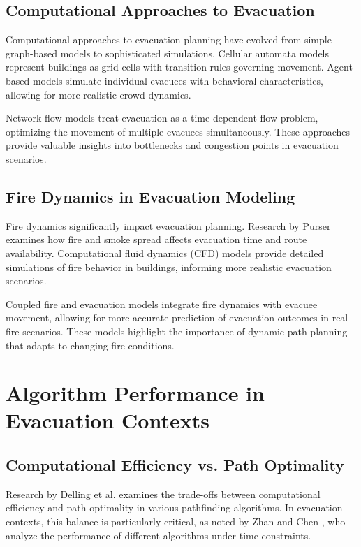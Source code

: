 \documentclass[11pt,a4paper]{report}
\begin{document}
\subsection{Computational Approaches to Evacuation}
Computational approaches to evacuation planning have evolved from simple graph-based models to sophisticated simulations. Cellular automata models \cite{zheng2009modeling} represent buildings as grid cells with transition rules governing movement. Agent-based models \cite{tang2008evacuation} simulate individual evacuees with behavioral characteristics, allowing for more realistic crowd dynamics.

Network flow models \cite{hamacher2002mathematical} treat evacuation as a time-dependent flow problem, optimizing the movement of multiple evacuees simultaneously. These approaches provide valuable insights into bottlenecks and congestion points in evacuation scenarios.

\subsection{Fire Dynamics in Evacuation Modeling}
Fire dynamics significantly impact evacuation planning. Research by Purser \cite{purser2002toxicity} examines how fire and smoke spread affects evacuation time and route availability. Computational fluid dynamics (CFD) models \cite{mcgrattan2000fire} provide detailed simulations of fire behavior in buildings, informing more realistic evacuation scenarios.

Coupled fire and evacuation models \cite{ronchi2013coupling} integrate fire dynamics with evacuee movement, allowing for more accurate prediction of evacuation outcomes in real fire scenarios. These models highlight the importance of dynamic path planning that adapts to changing fire conditions.

\section{Algorithm Performance in Evacuation Contexts}

\subsection{Computational Efficiency vs. Path Optimality}
Research by Delling et al. \cite{delling2009engineering} examines the trade-offs between computational efficiency and path optimality in various pathfinding algorithms. In evacuation contexts, this balance is particularly critical, as noted by Zhan and Chen \cite{zhan2008fastest}, who analyze the performance of different algorithms under time constraints.
\end{document}
